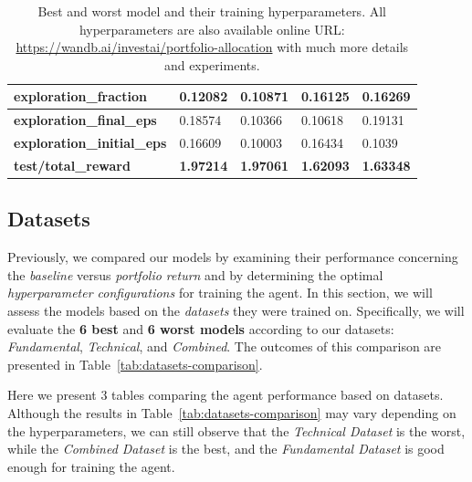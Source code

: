 \documentclass[../xlapes02]{subfiles}
\begin{document}
\begin{table}[h!]
{\begin{tabular}{|l||l|l||l|l|}
                \textbf{exploration\_fraction}     & 0.12082                                      & 0.10871                                      & 0.16125                                      & 0.16269                                      \\ \hline
                \textbf{exploration\_final\_eps}   & 0.18574                                      & 0.10366                                      & 0.10618                                      & 0.19131                                      \\ \hline
                \textbf{exploration\_initial\_eps} & 0.16609                                      & 0.10003                                      & 0.16434                                      & 0.1039                                       \\ \hline
                \textbf{test/total\_reward}        & \textcolor[RGB]{50,150,50}{\textbf{1.97214}} & \textcolor[RGB]{50,150,50}{\textbf{1.97061}} & \textcolor[RGB]{150,50,50}{\textbf{1.62093}} & \textcolor[RGB]{150,50,50}{\textbf{1.63348}} \\ \hline
            \end{tabular}
        }
        \caption{Best and worst model and their training hyperparameters. All hyperparameters are also available online URL: \url{https://wandb.ai/investai/portfolio-allocation} with much more details and experiments.}
        \label{tab:best-worst-hyperparameters}
    \end{table}

    \subsection{Datasets}\label{subsec:datasets}
    Previously, we compared our models by examining their performance concerning the \emph{baseline} versus \emph{portfolio return} and by determining the optimal \emph{hyperparameter configurations} for training the agent. In this section, we will assess the models based on the \emph{datasets} they were trained on. Specifically, we will evaluate the \textbf{6 best} and \textbf{6 worst models} according to our datasets: \emph{Fundamental}, \emph{Technical}, and \emph{Combined}. The outcomes of this comparison are presented in Table~\cref{tab:datasets-comparison}.

    Here we present 3 tables comparing the agent performance based on datasets. Although the results in Table~\cref{tab:datasets-comparison} may vary depending on the hyperparameters, we can still observe that the \emph{Technical Dataset} is the worst, while the \emph{Combined Dataset} is the best, and the \emph{Fundamental Dataset} is good enough for training the agent.
\end{document}
